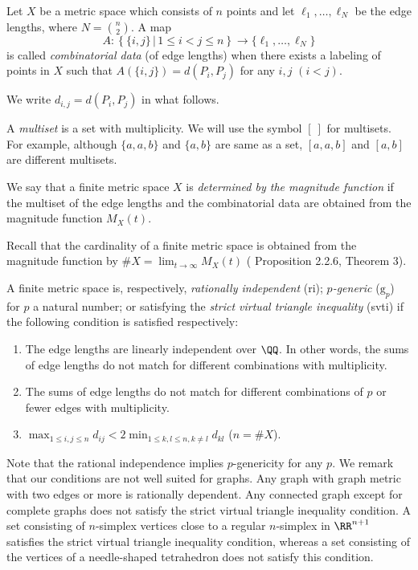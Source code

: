 \begin{definition} \rm 
Let $X$ be a metric space which consists of $n$ points and let $\ell_1,\dots, \ell_N$ be the edge lengths, where $N={n\choose2}$. 
A map 
\[A\colon \left\{\{i,j\}\,|\,1\le i<j\le n \right\}\to\{\ell_1,\dots,\ell_N\}\]
is called {\em combinatorial data} (of edge lengths) when there exists a labeling of points in $X$ such that $A(\{i,j\})=d(P_i,P_j)$ for any $i,j$ $(i<j)$. 

We write $d_{i,j}=d(P_i,P_j)$ in what follows. 
\end{definition}

A {\em multiset} is a set with multiplicity. We will use the symbol $[\>]$ for multisets. For example, although $\{a,a,b\}$ and $\{a,b\}$ are same as a set, $[a,a,b]$ and $[a,b]$ are different multisets. 

\begin{definition}\label{def_2} \rm 
We say that a finite metric space $X$ is {\em determined by the magnitude function} if the multiset of the edge lengths and the combinatorial data are obtained from the magnitude function $M_X(t)$. 
%
%
%
\end{definition}

Recall that the cardinality of a finite metric space is obtained from the magnitude function by $\#X=\lim_{t\to\infty}M_X(t)$ (\cite{L13} Proposition 2.2.6, \cite{LW} Theorem 3). 

\begin{definition} \rm 
A finite metric space is, respectively, {\em rationally independent} (ri); {\em $p$-generic} ($\mbox{g}_p$) for $p$ a natural number; or satisfying the {\em strict virtual triangle inequality} (svti) if the following condition is satisfied respectively:
\begin{enumerate}
\item[($\mbox{ri}$)] The edge lengths are linearly independent over $\QQ$. In other words, the sums of edge lengths do not match for different combinations with multiplicity.
%
\item[($\mbox{g}_p$)] The sums of edge lengths do not match for different combinations of $p$ or fewer edges with multiplicity.
%
\item[(svti)] $\displaystyle \max_{1\le i,j\le n} d_{ij}<2\min_{1\le k,l\le n, k\ne l} d_{kl}$ \qquad ($n=\#X$).
\end{enumerate}
\end{definition}

Note that the rational independence implies $p$-genericity for any $p$. 
We remark that our conditions are not well suited for graphs. Any graph with graph metric with two edges or more is rationally dependent. Any connected graph except for complete graphs does not satisfy the strict virtual triangle inequality condition. 
A set consisting of $n$-simplex vertices close to a regular $n$-simplex in $\RR^{n+1}$ satisfies the strict virtual triangle inequality condition, whereas a set consisting of the vertices of a needle-shaped tetrahedron does not satisfy this condition. 


